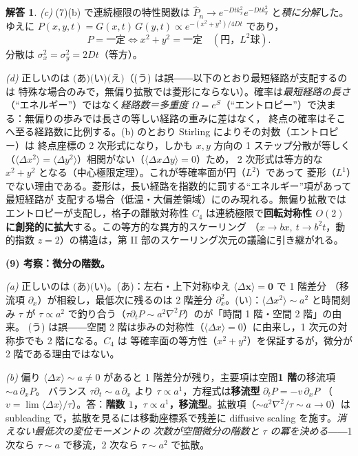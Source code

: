 \documentclass[dvipdfmx, uplatex]{jsarticle}
\newcommand{\bx}{\bm{x}}
\theoremstyle{definition}
\newtheorem*{sol}{解答}
\begin{document}
\begin{sol}
\textit{(c)} (7)(b) で連続極限の特性関数は $\hat P_n\to e^{-Dt k_x^2}e^{-Dt k_y^2}$ と\emph{積に分解}した。
ゆえに $P(x,y,t)=G(x,t)\,G(y,t)\propto e^{-(x^2+y^2)/4Dt}$ であり，
\[
    P=\text{一定}\iff\boxed{x^2+y^2=\text{一定}}\quad(\text{円，}L^2\text{球}).
\]
分散は $\boxed{\sigma_x^2=\sigma_y^2=2Dt}$（等方）。

\textit{(d)} 正しいのは $\boxed{\text{(あ)(い)(え)}}$（(う) は誤――以下のとおり最短経路が支配するのは
特殊な場合のみで，無偏り拡散では菱形にならない）。確率は\emph{最短経路の長さ}（``エネルギー''）ではなく\emph{経路数＝多重度}
$\Omega=e^{S}$（``エントロピー''）で決まる：無偏りの歩みでは長さの等しい経路の重みに差はなく，
終点の確率はそこへ至る経路数に比例する。(b) のとおり Stirling によりその対数（エントロピー）は
終点座標の 2 次形式になり，しかも $x,y$ 方向の 1 ステップ分散が等しく
（$\langle\Delta x^2\rangle=\langle\Delta y^2\rangle$）相関がない（$\langle\Delta x\Delta y\rangle=0$）ため，
2 次形式は等方的な $x^2+y^2$ となる（中心極限定理）。これが等確率面が円（$L^2$）であって
菱形（$L^1$）でない理由である。菱形は，長い経路を指数的に罰する``エネルギー''項があって最短経路が
支配する場合（低温・大偏差領域）にのみ現れる。無偏り拡散ではエントロピーが支配し，格子の離散対称性
$C_4$ は連続極限で\textbf{回転対称性 $O(2)$ に創発的に拡大}する。この等方的な異方的スケーリング
（$x\to bx,\ t\to b^2t$，動的指数 $z=2$）の構造は，第 II 部のスケーリング次元の議論に引き継がれる。

\par\smallskip
\textbf{(9) 考察：微分の階数。}

\textit{(a)} 正しいのは $\boxed{\text{(あ)(い)}}$。(あ)：左右・上下対称ゆえ $\langle\Delta\bx\rangle=\bm0$ で 1 階差分
（移流項 $\partial_x$）が相殺し，最低次に残るのは 2 階差分 $\partial_x^2$。(い)：$\langle\Delta x^2\rangle\sim a^2$ と時間刻み
$\tau$ が $\tau\propto a^2$ で釣り合う（$\tau\partial_tP\sim a^2\nabla^2P$）のが「時間 1 階・空間 2 階」の由来。
(う) は誤――空間 2 階は歩みの対称性（$\langle\Delta x\rangle=0$）に由来し，1 次元の対称歩でも 2 階になる。$C_4$ は
等確率面の等方性（$x^2+y^2$）を保証するが，微分が 2 階である理由ではない。

\textit{(b)} 偏り $\langle\Delta x\rangle\sim a\neq0$ があると 1 階差分が残り，主要項は空間\textbf{1 階}の移流項 $\sim a\,\partial_xP$。
バランス $\tau\partial_t\sim a\,\partial_x$ より $\boxed{\tau\propto a^{1}}$，方程式は\textbf{移流型} $\boxed{\partial_tP=-v\,\partial_xP}$
（$v=\lim\langle\Delta x\rangle/\tau$）。答：\textbf{階数 $1$，$\tau\propto a^1$，移流型}。拡散項（$\sim a^2\nabla^2/\tau\sim a\to0$）は
subleading で，拡散を見るには移動座標系で残差に diffusive scaling を施す。\emph{消えない最低次の変位モーメントの
次数が空間微分の階数と $\tau$ の冪を決める}――1 次なら $\tau\sim a$ で移流，2 次なら $\tau\sim a^2$ で拡散。
\end{sol}
\end{document}
